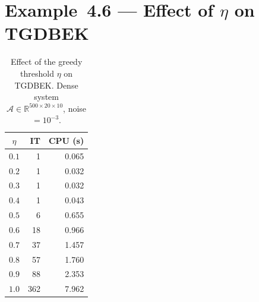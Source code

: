\documentclass[11pt,a4paper]{article}
\begin{document}
\section*{Example~4.6 — Effect of $\eta$ on TGDBEK}

\begin{table}[ht]
\centering
\caption{Effect of the greedy threshold $\eta$ on TGDBEK. Dense system $\mathcal{A}\in\mathbb{R}^{500\times 20\times 10}$, noise $=10^{-3}$.}
\label{tab:eta}
\begin{tabular}{crr}
\toprule
$\eta$ & IT & CPU (s) \\
\midrule
$0.1$ & 1 & 0.065 \\
$0.2$ & 1 & 0.032 \\
$0.3$ & 1 & 0.032 \\
$0.4$ & 1 & 0.043 \\
$0.5$ & 6 & 0.655 \\
$0.6$ & 18 & 0.966 \\
$0.7$ & 37 & 1.457 \\
$0.8$ & 57 & 1.760 \\
$0.9$ & 88 & 2.353 \\
$1.0$ & 362 & 7.962 \\
\bottomrule
\end{tabular}
\end{table}
\end{document}
